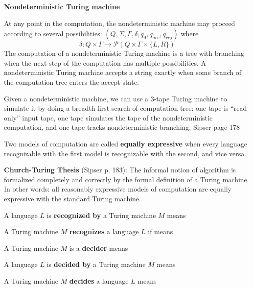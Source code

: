 \documentclass[12pt, oneside]{article}
\begin{document}
{\bf Nondeterministic Turing machine}

At any point in the computation, the nondeterministic machine may proceed according to 
several possibilities: $(Q, \Sigma, \Gamma, \delta, q_0, q_{acc}, q_{rej})$ where 
\[
\delta: Q \times \Gamma \to \mathcal{P}(Q \times \Gamma \times \{L, R\})  
\]
The computation of a nondeterministic Turing machine is a tree with branching
when the next step of the computation has multiple possibilities. A nondeterministic
Turing machine accepts a string exactly when some branch of the computation tree 
enters the accept state.

Given a nondeterministic machine, we can use a $3$-tape Turing machine to 
simulate it by doing a breadth-first search of computation tree: one tape 
is ``read-only'' input tape, one tape simulates the tape of the nondeterministic
computation, and one tape tracks nondeterministic branching. {\tiny Sipser page 178} 

\vfill
Two models of computation are called {\bf equally expressive} when 
every language recognizable with the first model is recognizable with the second, and vice versa.

{\bf  Church-Turing Thesis} (Sipser p. 183): The informal notion of algorithm is formalized completely  and correctly by the 
formal definition of a  Turing machine. In other words: all reasonably expressive models of 
computation are equally expressive with the standard Turing machine.

\vfill

\newpage


A language $L$ is {\bf recognized by} a Turing machine $M$ means

\vspace{15pt}

A Turing  machine  $M$ {\bf  recognizes} a language $L$ if means

\vspace{15pt}

A Turing machine $M$ is a {\bf decider}  means

\vspace{15pt}

A language  $L$ is {\bf decided by} a Turing  machine  $M$  means

\vspace{15pt}

A  Turing machine $M$ {\bf decides} a language $L$ means

\vspace{15pt}
\end{document}
